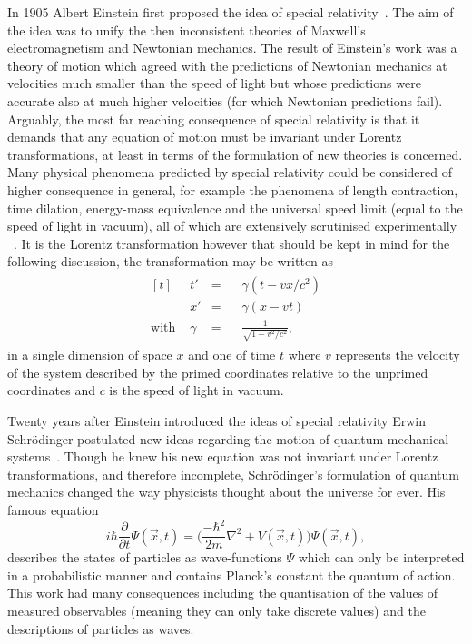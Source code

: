 In 1905 Albert Einstein first proposed the idea of special
relativity~\cite{Einstein:special}. The aim of the idea was to unify the then
inconsistent theories of Maxwell's electromagnetism and Newtonian mechanics. The
result of Einstein's work was a theory of motion which agreed with the
predictions of Newtonian mechanics at velocities much smaller than the speed of
light but whose predictions were accurate also at much higher velocities (for
which Newtonian predictions fail). Arguably, the most far reaching consequence of
special relativity is that it demands that any equation of motion must be
invariant under Lorentz transformations, at least in terms of the formulation of
new theories is concerned. Many physical phenomena predicted by special
relativity could be considered of higher consequence in general, for example the
phenomena of length contraction, time dilation, energy-mass equivalence and the
universal speed limit (equal to the speed of light in vacuum), all of which are
extensively scrutinised experimentally ~\cite{sr-tests-1, sr-tests-2,
  sr-tests-3, sr-tests-4, sr-tests-5, sr-tests-6, sr-tests-7}. It is the Lorentz
transformation however that should be kept in mind for the following discussion,
the transformation may be written as
\begin{equation}
  \label{eq:lorentz}
  \begin{split}
    \begin{aligned}[t]
      &t'&=&\;\;\;\gamma(t -vx/c^{2})\\
      &x'&=&\;\;\;\gamma(x - vt)\\
      \text{with } &\gamma&=&\;\;\;\frac{1}{\sqrt{1 - v^{2}/c^{2}}},
    \end{aligned}
  \end{split}
\end{equation}
in a single dimension of space $x$ and one of time $t$ where $v$ represents the
velocity of the system described by the primed coordinates relative to the
unprimed coordinates and $c$ is the speed of light in vacuum.  

Twenty years after Einstein introduced the ideas of special relativity Erwin
Schr\"odinger postulated new ideas regarding the motion of quantum mechanical
systems~\cite{Schrodinger}. Though he knew his new equation was not invariant
under Lorentz transformations, and therefore incomplete, Schr\"odinger's
formulation of quantum mechanics changed the way physicists thought about the
universe for ever. His famous equation
\begin{equation}
  \label{eq:schrodinger}
  i\hbar\frac{\partial}{\partial t}\Psi(\vec{x}, t) =
  \Bigg(\frac{-\hbar^{2}}{2m}\nabla^{2} + V(\vec{x}, t)  \Bigg)\Psi(\vec{x}, t),
\end{equation}
describes the states of particles as wave-functions $\Psi$ which can only be
interpreted in a probabilistic manner and contains Planck's constant the quantum
of action. This work had many consequences including the quantisation of the
values of measured observables (meaning they can only take discrete values) and
the descriptions of particles as waves.

